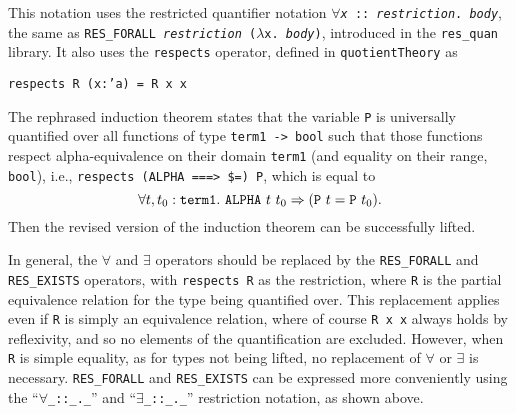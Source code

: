 \documentclass[envcountsame,runningheads]{llncs}
\newcommand{\quotient}{partial equivalence}
\begin{document}
This notation uses the restricted quantifier notation
{\tt $\forall${\it x} :: {\it restriction}. {\it body}},
the same as
{\tt RES\_FORALL {\it restriction} ($\lambda$x. {\it body})},
introduced in
the {\tt res\_quan} library. It also uses the {\tt respects} operator,
defined in {\tt quotientTheory} as
\begin{center}
{\tt respects R (x:'a) = R x x}
\end{center}
The rephrased induction theorem
states that the variable {\tt P}
is universally quantified over all functions of type {\tt term1 -> bool}
such that those functions respect alpha-equivalence on their domain
{\tt term1}
(and equality on their range,
{\tt bool}),
i.e., {\tt respects (ALPHA ===> \$=) P}, which is equal to
$$\forall t,t_0 : {\tt term1}.\
{\tt ALPHA}\ t\ t_0 \Rightarrow ({\tt P}\ t = {\tt P}\ t_0).$$
Then the revised version of the induction theorem can be successfully
lifted.

In general, the {\tt $\forall$} and {\tt $\exists$}
operators should be replaced by the
{\tt RES\_FORALL} and
{\tt RES\_EXISTS} operators,
with {\tt respects R} as the restriction, where {\tt R} is the
\quotient{} relation for the type being quantified over.
This replacement applies even if {\tt R} is simply an equivalence relation,
where of course {\tt R x x} always holds by reflexivity, and so
no elements of the quantification are excluded.
However, when {\tt R} is simple equality, as for types not being lifted,
no replacement of {\tt $\forall$} or {\tt $\exists$}
is necessary.
{\tt RES\_FORALL} and {\tt RES\_EXISTS} can be
expressed more conveniently using the
``{\tt $\forall$\_::\_.\_}'' and
``{\tt $\exists$\_::\_.\_}''
restriction notation, as shown above.
\end{document}
